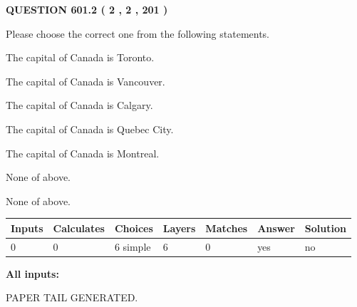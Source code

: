 \documentclass[12pt]{article}
\begin{document}
\vspace{0.2in}
  
{\textbf{\Large{QUESTION
601.2 
 ( 2 , 2 , 201 )
}}}
  
  
Please choose the correct one from the following statements.
 
 
The capital of Canada is Toronto.
 
 
The capital of Canada is Vancouver.
 
 
The capital of Canada is Calgary.
 
 
The capital of Canada is Quebec City.
 
 
The capital of Canada is Montreal.
 
 
 None of above.
 
 
\noindent{}
 
 
 None of above.
 
 
\noindent{}
 
 
   
   
   
   
\noindent\begin{tabular}{|l|l|l|l|l|l|l|}
 \hline
Inputs & Calculates & Choices & Layers & Matches & Answer & Solution \\ \hline
 0  & 
 0  & 
 6
  simple  
  & 
 6  & 
 0  & 
  yes & 
  no 
  \\ \hline
 \end{tabular}
   
   
   
   
\noindent{}
   
   
   
   
\noindent\vspace{0.1in}\hspace{-0.08in} {\textbf{\Large{All inputs: }}}
   
   
   
   
   
   
 \vspace{0.2in}
 
   
   
\vspace{2.0in} PAPER TAIL GENERATED.
   
\end{document}
